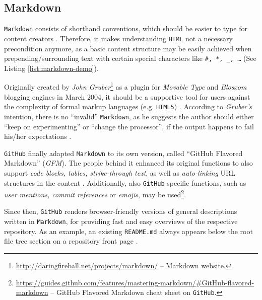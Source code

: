 \subsection{Markdown}
\label{sec:buildpipelines-markdown}



\texttt{Markdown} consists of shorthand conventions, which should be easier to type for content creators  \cite[38]{dhillon2016}.
Therefore, it makes understanding \texttt{HTML} not a necessary precondition anymore, as a basic content structure may be easily achieved when prepending/surrounding text with certain special characters like \texttt{\#, *, \_, \ldots} (See Listing \ref{list:markdown-demo}).

Originally created by \emph{John Gruber}\footnote{\url{http://daringfireball.net/projects/markdown/} -- Markdown website.} as a plugin for \emph{Movable Type} and \emph{Blosxom} blogging engines \cite{Markdown2004introduction} in March 2004, it should be a supportive tool for users against the complexity of formal markup languages (e.g. \texttt{HTML5}) \cite[4]{RFC7764}. According to \emph{Gruber's} intention, there is no ``invalid'' \texttt{Markdown}, as he suggests the author should either ``keep on experimenting'' or ``change the processor'', if the output happens to fail his/her expectations \cite[5]{RFC7764}.

\texttt{GitHub} finally adapted \texttt{Markdown} to its own version, called ``GitHub Flavored Markdown'' (\emph{GFM}). The people behind it enhanced its original functions to also support \emph{code blocks, tables, strike-through text}, as well as \emph{auto-linking} URL structures in the content \cite[18]{RFC7764}. Additionally, also \texttt{GitHub}-specific functions, such as \emph{user mentions, commit references} or \emph{emojis}, may be used\footnote{\url{https://guides.github.com/features/mastering-markdown/\#GitHub-flavored-markdown} -- GitHub Flavored Markdown cheat sheet on \texttt{GitHub}.}.

Since then, \texttt{GitHub} renders browser-friendly versions of general descriptions written in \texttt{Markdown}, for providing fast and easy overviews of the respective repository. As an example, an existing \texttt{README.md} always appears below the root file tree section on a repository front page \cite[5]{gandrud2013github}.

